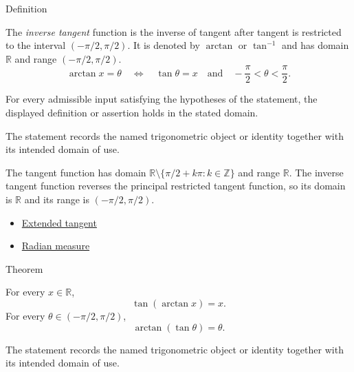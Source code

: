 

\begin{definitionbox}{Definition}
\begin{definition}
\label{def:inverse-tangent}
The \emph{inverse tangent} function is the inverse of tangent after tangent is
restricted to the interval $(-\pi/2,\pi/2)$. It is denoted by $\arctan$ or
$\tan^{-1}$ and has domain $\mathbb{R}$ and range $(-\pi/2,\pi/2)$.
\[
  \arctan x=\theta
  \quad\Longleftrightarrow\quad
  \tan\theta=x
  \quad\text{and}\quad
  -\frac{\pi}{2}<\theta<\frac{\pi}{2}.
\]
\end{definition}
\end{definitionbox}
\begin{remark*}
For every admissible input satisfying the hypotheses of the statement, the
displayed definition or assertion holds in the stated domain.
\end{remark*}

\begin{remark*}[Interpretation]
The statement records the named trigonometric object or identity together with
its intended domain of use.
\end{remark*}

\begin{remark*}
The tangent function has domain
$\mathbb{R}\setminus\{\pi/2+k\pi:k\in\mathbb{Z}\}$ and range $\mathbb{R}$.
The inverse tangent function reverses the principal restricted tangent
function, so its domain is $\mathbb{R}$ and its range is
$(-\pi/2,\pi/2)$.
\end{remark*}
\begin{dependencies}
\begin{itemize}
  \item \hyperref[def:extended-tangent]{Extended tangent}
  \item \hyperref[def:radian-measure]{Radian measure}
\end{itemize}
\end{dependencies}

\begin{theorembox}{Theorem}
\begin{theorem}
\label{thm:inverse-tangent-identities}
For every $x\in\mathbb{R}$,
\[
  \tan(\arctan x)=x.
\]
For every $\theta\in(-\pi/2,\pi/2)$,
\[
  \arctan(\tan\theta)=\theta.
\]
\end{theorem}
\end{theorembox}
\begin{remark*}[Interpretation]
The statement records the named trigonometric object or identity together with
its intended domain of use.
\end{remark*}

